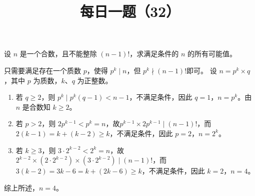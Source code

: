 \documentclass[a4paper]{exam}
\title{\huge \heiti \color{dblue} 每日一题（32）\\\pgfornament[scale=0.4]{84}}
\author{}
\date{}
\begin{document}
\maketitle

\thispagestyle{headandfoot}


\begin{questions}

\setcounter{question}{31}

\question
设 $n$ 是一个合数，且不能整除 $(n-1)!$，求满足条件的 $n$ 的所有可能值。

\begin{solution}
    只需要满足存在一个质数 $p$，使得 $p^k\mid n$，但 $p^k\nmid (n-1)!$即可。
    设 $n=p^k\times q$，其中 $p$ 为质数，$k$、$q$ 为正整数。
    \begin{enumerate}[label={(\arabic*)}]
        \item 若 $q\geqslant 2$，则 $p^k\mid p^k(q-1) < n-1$，不满足条件，因此 $q=1$，$n=p^k$。由 $n$ 是合数知 $k\geqslant 2$。
        \item 若 $p>2$，则 $2p^{k-1}<p^k=n$，故$p^{k-1}\times 2p^{k-1}\mid (n-1)!$，而 $2(k-1)=k+(k-2)\geqslant k$，不满足条件，因此 $p=2$，$n=2^k$。
        \item 若 $k\geqslant 3$，则 $3\cdot 2^{k-2}<2^k=n$，故 $2^{k-2}\times \left(2\cdot 2^{k-2}\right)\times \left(3\cdot 2^{k-2}\right)\mid (n-1)!$，而 $3(k-2)=3k-6=k+(2k-6)\geqslant k$，不满足条件，因此 $k=2$，$n=4$。
    \end{enumerate}
    综上所述，$n=4$。
\end{solution}

\end{questions}
\end{document}
